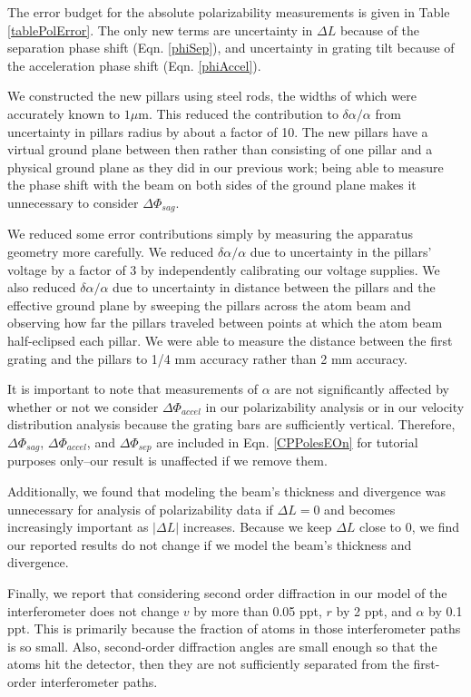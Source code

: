 \documentclass[twocolumn,prl,showpacs,superscriptaddress]{revtex4-1}   %
\newcommand{\eqnref}[1]{Eqn. \eqref{#1}}
\begin{document}
The error budget for the absolute polarizability measurements is given in Table \ref{tablePolError}. The only new terms are uncertainty in $\Delta L$ because of  the separation phase shift (\eqnref{phiSep}), and uncertainty in grating tilt because of the acceleration phase shift (\eqnref{phiAccel}).

We constructed the new pillars using steel rods, the widths of which were accurately known to $1 \mu \text{m}$. This reduced the contribution to $\delta\alpha/\alpha$ from uncertainty in pillars radius by about a factor of 10. The new pillars have a virtual ground plane between then rather than consisting of one pillar and a physical ground plane as they did in our previous work; being able to measure the phase shift with the beam on both sides of the ground plane makes it unnecessary to consider $\Delta\Phi_{sag}$. 

We reduced some error contributions simply by measuring the apparatus geometry more carefully. We reduced $\delta\alpha/\alpha$ due to uncertainty in the pillars' voltage by a factor of 3 by independently calibrating our voltage supplies. We also reduced $\delta\alpha/\alpha$ due to uncertainty in distance between the pillars and the effective ground plane by sweeping the pillars across the atom beam and observing how far the pillars traveled between points at which the atom beam half-eclipsed each pillar. We were able to measure the distance between the first grating and the pillars to 1/4 mm accuracy rather than 2 mm accuracy. 

It is important to note that measurements of $\alpha$ are not significantly affected by whether or not we consider $\Delta\Phi_{accel}$ in our polarizability analysis or in our velocity distribution analysis because the grating bars are sufficiently vertical. Therefore, $\Delta\Phi_{sag}$, $\Delta\Phi_{accel}$, and $\Delta\Phi_{sep}$ are included in \eqnref{CPPolesEOn} for tutorial purposes only--our result is unaffected if we remove them.

Additionally, we found that modeling the beam's thickness and divergence was unnecessary for analysis of polarizability data if $\Delta L = 0$ and becomes increasingly important as $|\Delta L|$ increases. Because we keep $\Delta L$ close to 0, we find our reported results do not change if we model the beam's thickness and divergence.

Finally, we report that considering second order diffraction in our model of the interferometer does not change $v$ by more than 0.05 ppt, $r$ by 2 ppt, and $\alpha$ by 0.1 ppt. This is primarily because the fraction of atoms in those interferometer paths is so small. Also, second-order diffraction angles are small enough so that the atoms hit the detector, then they are not sufficiently separated from the first-order interferometer paths.
\end{document}
